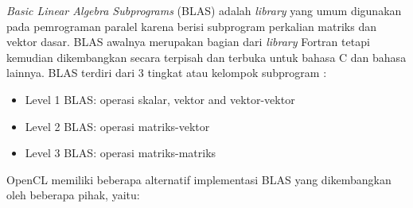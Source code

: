 \textit{Basic Linear Algebra Subprograms} (BLAS) adalah \textit{library} yang umum digunakan pada pemrograman paralel karena berisi subprogram perkalian matriks dan vektor dasar. BLAS \cite{blas.wiki} awalnya merupakan bagian dari \textit{library} Fortran tetapi kemudian dikembangkan secara terpisah dan terbuka untuk bahasa C dan bahasa lainnya. BLAS terdiri dari 3 tingkat atau kelompok subprogram \cite{blas.netlib}:

\begin{itemize}
	\item Level 1 BLAS: operasi skalar, vektor and vektor-vektor​
	\item Level 2 BLAS: operasi matriks-vektor​
	\item Level 3 BLAS: operasi matriks-matriks
\end{itemize}

OpenCL memiliki beberapa alternatif implementasi BLAS yang dikembangkan oleh beberapa pihak, yaitu:


